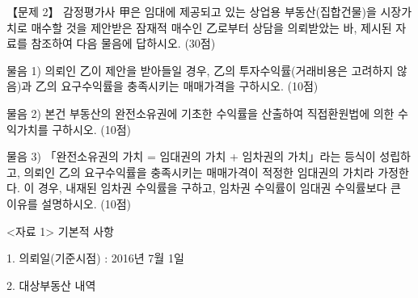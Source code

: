 \begin{longquestion}{【문제 2】}
감정평가사 甲은 임대에 제공되고 있는 상업용 부동산(집합건물)을 시장가치로 매수할 것을 제안받은 잠재적 매수인 乙로부터 상담을 의뢰받았는 바, 제시된 자료를 참조하여 다음 물음에 답하시오. (30점) \par
\medskip\noindent 물음 1) 의뢰인 乙이 제안을 받아들일 경우, 乙의 투자수익률(거래비용은 고려하지 않음)과 乙의 요구수익률을 충족시키는 매매가격을 구하시오. (10점) \par
\medskip\noindent 물음 2) 본건 부동산의 완전소유권에 기초한 수익률을 산출하여 직접환원법에 의한 수익가치를 구하시오. (10점) \par
\medskip\noindent 물음 3) 「완전소유권의 가치 = 임대권의 가치 + 임차권의 가치」라는 등식이 성립하고, 의뢰인 乙의 요구수익률을 충족시키는 매매가격이 적정한 임대권의 가치라 가정한다. 이 경우, 내재된 임차권 수익률을 구하고, 임차권 수익률이 임대권 수익률보다 큰 이유를 설명하시오. (10점) \par
<자료 1> 기본적 사항 \par
1. 의뢰일(기준시점) : 2016년 7월 1일 \par
2. 대상부동산 내역 \par
{\small\centering
{}\par}


\end{longquestion}
